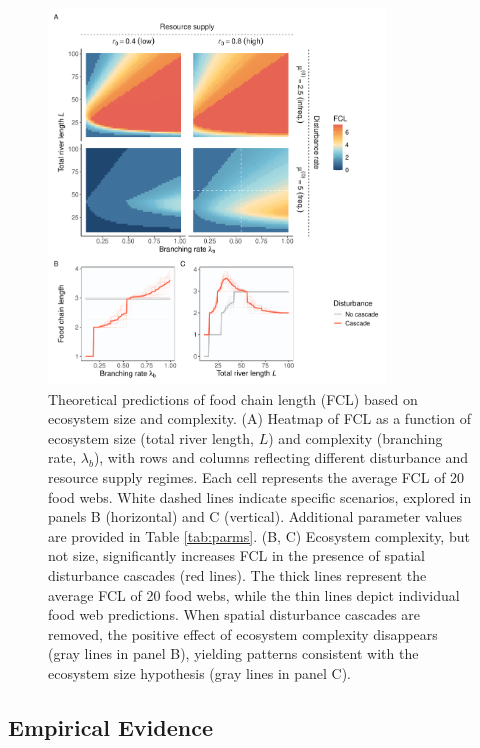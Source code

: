 \documentclass[11pt, class=article, crop=false]{standalone}
\begin{document}
\begin{figure}
    \centering
    \includegraphics[width=0.8\textwidth]{data_fmt/fig_theo_main.pdf}
    \caption{Theoretical predictions of food chain length (FCL) based on ecosystem size and complexity. (A) Heatmap of FCL as a function of ecosystem size (total river length, $L$) and complexity (branching rate, $\lambda_b$), with rows and columns reflecting different disturbance and resource supply regimes. Each cell represents the average FCL of 20 food webs. White dashed lines indicate specific scenarios, explored in panels B (horizontal) and C (vertical). Additional parameter values are provided in Table \ref{tab:parms}. (B, C) Ecosystem complexity, but not size, significantly increases FCL in the presence of spatial disturbance cascades (red lines). The thick lines represent the average FCL of 20 food webs, while the thin lines depict individual food web predictions. When spatial disturbance cascades are removed, the positive effect of ecosystem complexity disappears (gray lines in panel B), yielding patterns consistent with the ecosystem size hypothesis (gray lines in panel C).}
    \label{fig:sim-main}
\end{figure}

\subsection{Empirical Evidence}
\end{document}
